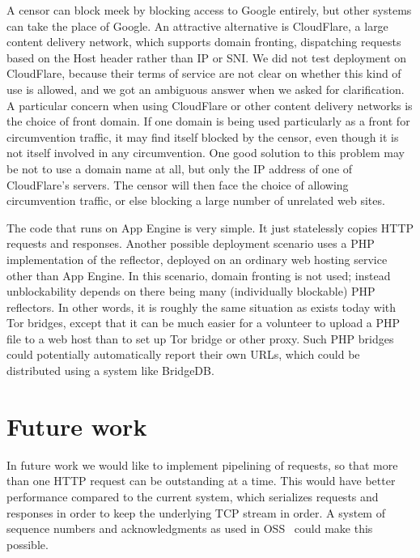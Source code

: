 \documentclass{article}
\begin{document}
A censor can block meek by blocking access to Google entirely,
but other systems can take the place of Google.
An attractive alternative is CloudFlare, a large content delivery network,
which supports domain fronting, dispatching requests based on the Host header
rather than IP or SNI.
We did not test deployment on CloudFlare,
because their terms of service are not clear on whether this kind of use is allowed,
and we got an ambiguous answer when we asked for clarification.
A particular concern when using CloudFlare or other content delivery networks is the choice of front domain.
If one domain is being used particularly as a front for circumvention traffic,
it may find itself blocked by the censor, even though it is not itself
involved in any circumvention.
One good solution to this problem may be not to use a domain name at all,
but only the IP address of one of CloudFlare's servers.
The censor will then face the choice of allowing circumvention traffic,
or else blocking a large number of unrelated web sites.


The code that runs on App Engine is very simple.
It just statelessly copies HTTP requests and responses.
Another possible deployment scenario uses a PHP implementation of the reflector,
deployed on an ordinary web hosting service other than App Engine.
In this scenario, domain fronting is not used;
instead unblockability depends on there being many (individually blockable) PHP reflectors.
In other words, it is roughly the same situation as exists today with Tor bridges,
except that it can be much easier for a volunteer to upload a PHP file to a web host
than to set up Tor bridge or other proxy.
Such PHP bridges could potentially automatically report their own URLs,
which could be distributed using a system like BridgeDB.

\section{Future work}

In future work we would like to implement pipelining of requests,
so that more than one HTTP request can be outstanding at a time.
This would have better performance compared to the current system,
which serializes requests and responses in order to keep the
underlying TCP stream in order.
A system of sequence numbers and acknowledgments as used in OSS~\cite{oss}
could make this possible.
\end{document}
